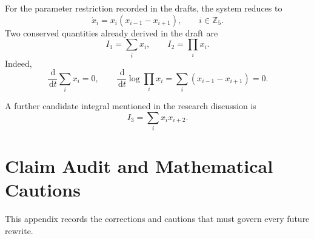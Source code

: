 \documentclass[11pt, reqno]{amsart}
\theoremstyle{definition}
\theoremstyle{remark}
\newcommand{\Z}{\mathbb{Z}}
\newcommand{\dd}{\,\mathrm{d}}
\begin{document}
	For the parameter restriction recorded in the drafts, the system reduces to
	\begin{equation}
		\label{eq:volterra-five}
		\dot x_i=x_i(x_{i-1}-x_{i+1}),
		\qquad i\in\Z_5.
	\end{equation}
	Two conserved quantities already derived in the draft are
	\begin{equation}
		\label{eq:first-integrals}
		I_1=\sum_i x_i,
		\qquad
		I_2=\prod_i x_i.
	\end{equation}
	Indeed,
	\[
	\frac{\dd}{\dd t}\sum_i x_i=0,
	\qquad
	\frac{\dd}{\dd t}\log\prod_i x_i
	=
	\sum_i(x_{i-1}-x_{i+1})=0.
	\]
	
	A further candidate integral mentioned in the research discussion is
	\begin{equation}
		\label{eq:third-integral-candidate}
		I_3=\sum_i x_i x_{i+2}.
	\end{equation}
	
	
	\section{Claim Audit and Mathematical Cautions}
	\label{app:claim-audit}
	
	This appendix records the corrections and cautions that must govern every
	future rewrite.
	
\end{document}
